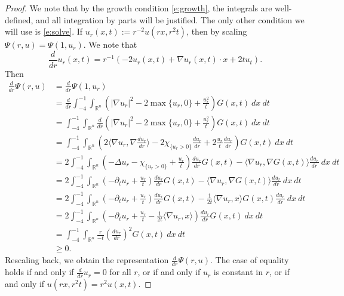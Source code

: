 \documentclass{amsart}
\numberwithin{equation}{section}
\begin{document}
\begin{proof}
 We note that by the growth condition \eqref{e:growth}, the integrals are well-defined, and all integration by parts will be justified. The only other condition we will use is \eqref{e:solve}. 
 If $u_r(x,t):=r^{-2}u(rx,r^2t)$, then by scaling $\Psi(r,u)=\Psi(1,u_r)$. We note that 
 \[
 \frac{d}{dr} u_r(x,t) = r^{-1}\left(-2u_r(x,t) + \nabla u_r(x,t) \cdot x+2 t u_t  \right). 
 \]
 Then 
 \[
 \begin{aligned}
     \frac{d}{dr} \Psi(r,u) 
     &= \frac{d}{dr} \Psi(1,u_r)\\
     &=\frac{d}{dr} \int_{-4}^{-1} \int_{\mathbb{R}^n} \left(|\nabla u_r|^2- 2\max\{u_r,0\} +\frac{u_r^2}{t} \right)G(x,t) \ dx \ dt\\
     &= \int_{-4}^{-1} \int_{\mathbb{R}^n} \frac{d}{dr}\left(|\nabla u_r|^2- 2\max\{u_r,0\} +\frac{u_r^2}{t} \right)G(x,t) \ dx \ dt\\
     &= \int_{-4}^{-1} \int_{\mathbb{R}^n} \left(2\langle\nabla u_r,\nabla \frac{d u_r}{dr}\rangle- 2\chi_{\{u_r>0\}}\frac{d u_r}{dr} + 2 \frac{u_r}{t} \frac{d u_r}{dr}\right)G(x,t) \ dx \ dt\\
     &= 2\int_{-4}^{-1} \int_{\mathbb{R}^n} \left(-\Delta u_r-\chi_{\{u_r>0\}} + \frac{u_r}{t}\right)\frac{d u_r}{dr}G(x,t) - \langle \nabla u_r ,\nabla G(x,t)\rangle \frac{d u_r}{dr}\ dx \ dt \\
     &=2\int_{-4}^{-1} \int_{\mathbb{R}^n} \left(-\partial_t u_r + \frac{u_r}{t}\right)\frac{d u_r}{dr}G(x,t) - \langle \nabla u_r ,\nabla G(x,t)\rangle \frac{d u_r}{dr}\ dx \ dt \\
     &=2\int_{-4}^{-1} \int_{\mathbb{R}^n} \left(-\partial_t u_r +\frac{u_r}{t}\right)\frac{d u_r}{dr}G(x,t) - \frac{1}{2t}\langle \nabla u_r ,x\rangle G(x,t)\frac{d u_r}{dr}\ dx \ dt \\
      &=2\int_{-4}^{-1} \int_{\mathbb{R}^n} \left(-\partial_t u_r + \frac{u_r}{t}- \frac{1}{2t}\langle \nabla u_r ,x\rangle\right)\frac{d u_r}{dr}G(x,t) \ dx \ dt \\
      &= \int_{-4}^{-1} \int_{\mathbb{R}^n} \frac{r}{-t} \left(\frac{d u_r}{dr} \right)^2 G(x,t) \ dx \ dt \\
      &\geq 0. 
 \end{aligned}
 \]
 Rescaling back, we obtain the representation $\frac{d}{dr}\Psi(r,u) $. The case of equality holds if and only if $\frac{d}{dr} u_r =0$ for all $r$, or if and only if $u_r$ is constant in $r$, or if and only if $u(rx,r^2t)=r^2u(x,t)$. 
\end{proof}
\end{document}
